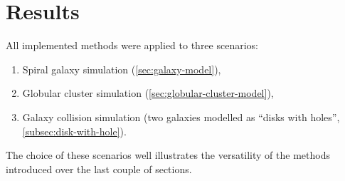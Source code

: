 \chapter{Results}
All implemented methods were applied to three scenarios:
\begin{enumerate}
    \item Spiral galaxy simulation (\autoref{sec:galaxy-model}),
    \item Globular cluster simulation (\autoref{sec:globular-cluster-model}),
    \item Galaxy collision simulation (two galaxies modelled as ``disks with holes'', \autoref{subsec:disk-with-hole}).
\end{enumerate}
The choice of these scenarios well illustrates the versatility of the methods introduced over the last couple of sections.




